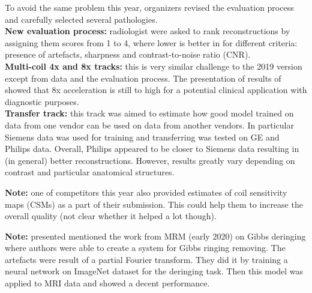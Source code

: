 To avoid the same problem this year, organizers revised the evaluation process and carefully selected several pathologies. \\

{\bf New evaluation process:} radiologist were asked to rank reconstructions by assigning them scores from 1 to 4, where lower is better in for different criteria: presence of artefacts, sharpness and contrast-to-noise ratio (CNR). \\

{\bf Multi-coil 4x and 8x tracks:} this is very similar challenge to the 2019 version except from data and the evaluation process. 
The presentation of results of showed that 8x acceleration is still to high for a potential clinical application with diagnostic purposes. \\

{\bf Transfer track:} this track was aimed to estimate how good model trained on data from one vendor can be used on data from another vendors.
In particular Siemens data was used for training and transferring was tested on GE and Philips data.
Overall, Philips appeared to be closer to Siemens data resulting in (in general) better reconstructions. 
However, results greatly vary depending on contrast and particular anatomical structures.

{\bf Note:} one of competitors this year also provided estimates of coil sensitivity maps (CSMs) as a part of their submission.
This could help them to increase the overall quality (not clear whether it helped a lot though).

{\bf Note:} presented mentioned the work from MRM (early 2020) on Gibbs deringing \cite{Muckley_2020} where authors were able to create a system for Gibbs ringing removing. The artefacts were result of a partial Fourier transform.
They did it by training a neural network on ImageNet dataset for the deringing task. 
Then this model was applied to MRI data and showed a decent performance. \\




